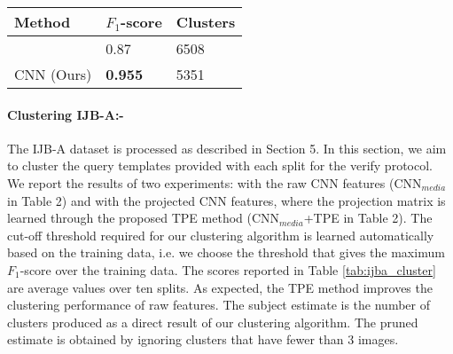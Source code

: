 \documentclass[10pt,twocolumn,letterpaper]{article}
\begin{document}
\begin{table}
\centering
\begin{tabular}{ | l | l | l|}
    \hline
    Method & $F_1$-score  & Clusters \\ \hline
    \cite{msu_cluster} & 0.87 & 6508 \\ \hline
    CNN (Ours) & \textbf{0.955} & 5351\\ \hline    
\end{tabular}
    \label{tab:lfw_cluster}
    \end{table}
\begin{table}
\centering
{}
\label{tab:ijba_cluster}
\end{table} 


\paragraph{Clustering IJB-A:-}The IJB-A dataset is processed as described in Section 5. In this section, we aim to cluster the query templates provided with each split for the verify protocol. We report the results of two experiments: with the raw CNN features (CNN$_{media}$ in Table 2) and with the projected CNN features, where the projection matrix is learned through the proposed TPE method (CNN$_{media}$+TPE in Table 2). The cut-off threshold required for our clustering algorithm is learned automatically based on the training data, i.e. we choose the threshold that gives the maximum $F_1$-score over the training data. The scores reported in Table \ref{tab:ijba_cluster} are average values over ten splits. As expected, the TPE method improves the clustering performance of raw features. The subject estimate is the number of clusters produced as a direct result of our clustering algorithm. The pruned estimate is obtained by ignoring clusters that have fewer than 3 images. 
\end{document}
